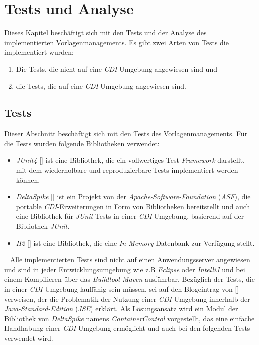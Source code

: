 \chapter{Tests und Analyse}
\label{cha:Analyse}
Dieses Kapitel beschäftigt sich mit den Tests und der Analyse des implementierten Vorlagenmanagements. Es gibt zwei Arten von Tests die implementiert wurden:
\begin{enumerate}
	\item Die Tests, die nicht auf eine \emph{CDI}-Umgebung angewiesen sind und 
	\item die Tests, die auf eine \emph{CDI}-Umgebung angewiesen sind.
\end{enumerate}

\section{Tests}
Dieser Abschnitt beschäftigt sich mit den Tests des Vorlagenmanagements. Für die Tests wurden folgende Bibliotheken verwendet:
\begin{itemize}
	\item\emph{JUnit4} [\cite{junit4}] ist eine Bibliothek, die ein vollwertiges Test-\emph{Framework} darstellt, mit dem wiederholbare und reproduzierbare Tests implementiert werden können.
	\item\emph{DeltaSpike} [\cite{deltaspike}] ist ein Projekt von der \emph{Apache-Software-Foundation} (\emph{ASF}), die portable \emph{CDI}-Erweiterungen in Form von Bibliotheken bereitstellt und auch eine Bibliothek für \emph{JUnit}-Tests in einer \emph{CDI}-Umgebung, basierend auf der Bibliothek \emph{JUnit}.
	\item\emph{H2} [\cite{h2}] ist eine Bibliothek, die eine \emph{In-Memory}-Datenbank zur Verfügung stellt.  
\end{itemize}
\ \newline
Alle implementierten Tests sind nicht auf einen Anwendungsserver angewiesen und sind in jeder Entwicklungsumgebung wie z.B \emph{Eclipse} oder \emph{IntelliJ} und bei einem Kompilieren über das \emph{Buildtool Maven} ausführbar.
\newline
\newline
Bezüglich der Tests, die in einer \emph{CDI}-Umgebung lauffähig sein müssen, sei auf den  Blogeintrag von [\cite{strubergBlog}] verweisen, der die Problematik der Nutzung einer \emph{CDI}-Umgebung innerhalb der \emph{Java-Standard-Edition} (\emph{JSE}) erklärt. Als Lösungsansatz wird ein Modul der Bibliothek von \emph{DeltaSpike} namens \emph{ContainerControl} vorgestellt, das eine einfache Handhabung einer \emph{CDI}-Umgebung ermöglicht und auch bei den folgenden Tests verwendet wird.
